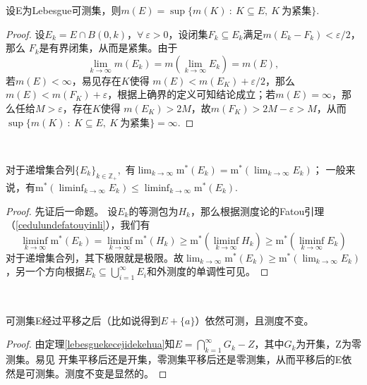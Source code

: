 \documentclass[color=green,thmcnt=section,lang=cn,12pt]{elegantbook}
\numberwithin{equation}{section}%
\numberwithin{figure}{section}%
\newcommand{\ZZ}{\mathbb{Z}}
\newcommand{\ee}{\varepsilon}
\newcommand{\any}{\forall \ }
\newcommand{\csf}[1]{\{#1_k\}_{k\in \ZZ_+}} %
\newcommand{\cu}[1]{\bigcup_{#1=1}^{\infty}} %
\newcommand{\ci}[1]{\bigcap_{#1=1}^{\infty}} %
\newcommand{\linf}[1]{\liminf_{k\rightarrow \infty}#1_k} %
\newcommand{\li}[1]{\lim_{k\rightarrow \infty}#1_k} %
\newcommand{\mx}[1]{\textrm{m}^*(#1)} %
\begin{document}
\begin{corollary}\label{kecejibeijinjibijin}
    设E为Lebesgue可测集，则$m(E)=\sup\{m(K)\ :\ K\subseteq E,\ K\ \mbox{为紧集}\}$.
\end{corollary}
\begin{proof}
    设$E_k=E\cap B(0,k)$，$\any\ee>0$，设闭集$F_k\subseteq E_k$满足$m(E_k-F_k)<\ee/2$，那么
    $F_k$是有界闭集，从而是紧集。由于$$\lim_{k\to\infty}m(E_k)=m(\lim_{k\to\infty}E_k)=m(E),$$若$m(E)<\infty$，易见存在$K$使得
    $m(E)<m(E_K)+\ee/2$，那么$m(E)<m(F_K)+\ee$，根据上确界的定义可知结论成立；若$m(E)=\infty$，那么任给$M>\ee$，存在$K$使得
    $m(E_K)>2M$，故$m(F_K)>2M-\ee>M$，从而$\sup\{m(K)\ :\ K\subseteq E,\ K\ \mbox{为紧集}\}=\infty$.
\end{proof}
\ 


\begin{example}[（外测度的从下连续性）]\label{waicedudecongxialianxuxing}
对于递增集合列$\csf{E}$,\ 有$\lim_{k \rightarrow \infty}\mx{E_k}=\mx{\li{E}}$；
一般来说，有$\mx{\linf{E}}\leq \liminf_{k\rightarrow \infty}\mx{E_k}$.\ 
\end{example}
\begin{proof}
    先证后一命题。
    设$E_k$的等测包为$H_k$，那么根据测度论的Fatou引理（\ref{cedulundefatouyinli}），我们有
    \begin{equation*}
        \liminf_{k \rightarrow \infty}\mx{E_k}=\liminf_{k \rightarrow \infty}\mx{H_k}\geq \mx{\liminf_{k \rightarrow \infty}H_k}\geq \mx{\liminf_{k \rightarrow \infty}E_k}
    \end{equation*}
    对于递增集合列，其下极限就是极限。故$\lim_{k\to\infty}\mx{E_k}\geq \mx{\li{E}}$，另一个方向根据$E_k\subseteq \cu{i}E_i$和外测度的单调性可见。
\end{proof}
\ 


\begin{example}[（平移不变性）]
    可测集E经过平移之后（比如说得到$E+\{a\}$）依然可测，且测度不变。
\end{example}
\begin{proof}
    由定理\ref{lebesguekecejidekehua}知$E=\ci{k}G_k-Z$，其中$G_k$为开集，Z为零测集。易见
    开集平移后还是开集，零测集平移后还是零测集，从而平移后的E依然是可测集。测度不变是显然的。
\end{proof}
\ 
\end{document}
